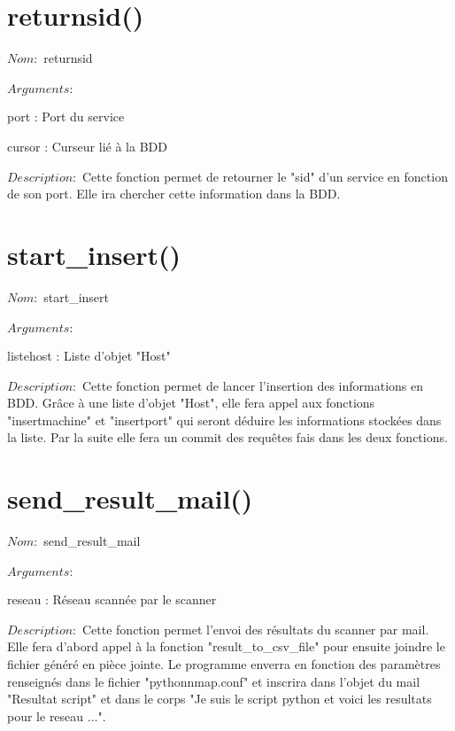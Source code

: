 \documentclass[12pt]{report}
\begin{document}
		\section{returnsid()}
			{\setlength{\parindent}{0cm}
			$Nom :$ returnsid\\\\
			}
			$Arguments :$
			\begin{description}
				\item port : Port du service
				\item cursor : Curseur lié à la BDD\\
			\end{description}
			$Description : $ Cette fonction permet de retourner le "sid" d'un service en fonction de son port. Elle ira chercher cette information dans la BDD.
		\section{start\_insert()}
			{\setlength{\parindent}{0cm}
			$Nom :$ start\_insert\\\\
			}
			$Arguments :$
			\begin{description}
				\item listehost : Liste d'objet "Host"\\
			\end{description}
			$Description : $ Cette fonction permet de lancer l'insertion des informations en BDD. Grâce à une liste d'objet "Host", elle fera appel aux fonctions "insertmachine" et "insertport" qui seront déduire les informations stockées dans la liste. Par la suite elle fera un commit des requêtes fais dans les deux fonctions. 
		\section{send\_result\_mail()}
			{\setlength{\parindent}{0cm}
			$Nom :$ send\_result\_mail\\\\
			}
			$Arguments :$
			\begin{description}
				\item reseau : Réseau scannée par le scanner\\
			\end{description}
			$Description : $ Cette fonction permet l'envoi des résultats du scanner par mail. Elle fera d'abord appel à la fonction "result\_to\_csv\_file" pour ensuite joindre le fichier généré en pièce jointe. Le programme enverra en fonction des paramètres renseignés dans le fichier "pythonnmap.conf" et inscrira dans l'objet du mail "Resultat script" et dans le corps "Je suis le script python et voici les resultats pour le reseau ...".
\end{document}
